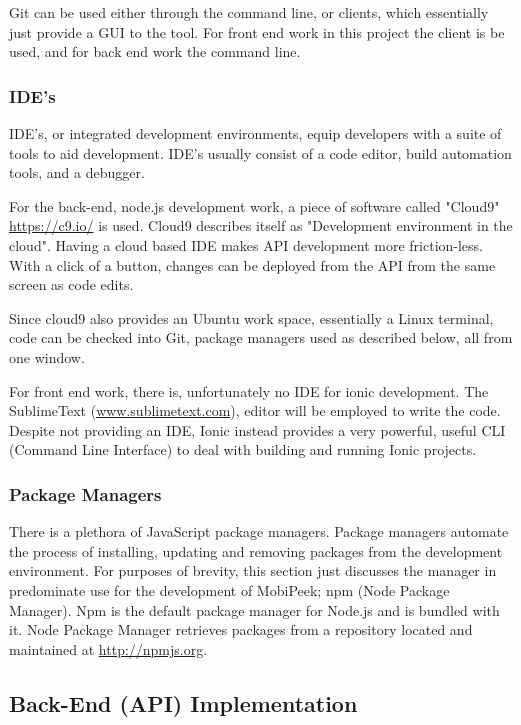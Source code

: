 \documentclass[a4paper]{article}
\begin{document}
Git can be used either through the command line, or clients, which essentially just provide a GUI to the tool. For front end work in this project the client is be used, and for back end work the command line.
\subsubsection{IDE's}
IDE's, or integrated development environments, equip developers with a suite of tools to aid development. IDE's usually consist of a code editor, build automation tools, and a debugger.

For the back-end, node.js development work, a piece of software called "Cloud9" \url{https://c9.io/} is used. Cloud9 describes itself as "Development environment in the cloud". Having a cloud based IDE makes API development more friction-less. With a click of a button, changes can be deployed from the API from the same screen as code edits.

Since cloud9 also provides an Ubuntu work space, essentially a Linux terminal, code can be checked into Git, package managers used as described below, all from one window.

For front end work, there is, unfortunately no IDE for ionic development. The SublimeText (\url{www.sublimetext.com}), editor will be employed to write the code. Despite not providing an IDE, Ionic instead provides a very powerful, useful CLI (Command Line Interface) to deal with building and running Ionic projects.

\subsubsection{Package Managers}
There is a plethora of JavaScript package managers. Package managers automate the process of installing, updating and removing packages from the development environment. For purposes of brevity, this section just discusses the manager in predominate use for the development of MobiPeek; npm (Node Package Manager). Npm is the default package manager for Node.js and is bundled with it. Node Package Manager retrieves packages from a repository located and maintained at \url{http://npmjs.org}.

\subsection{Back-End (API) Implementation}
\end{document}
